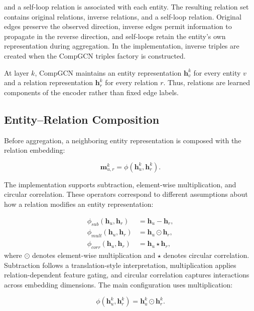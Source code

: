 and a self-loop relation is associated with each entity. The resulting
relation set contains original relations, inverse relations, and a self-loop
relation. Original edges preserve the observed direction, inverse edges permit
information to propagate in the reverse direction, and self-loops retain the
entity's own representation during aggregation. In the implementation,
inverse triples are created when the CompGCN triples factory is constructed.

At layer $k$, CompGCN maintains an entity representation
$\mathbf{h}_{v}^{k}$ for every entity $v$ and a relation representation
$\mathbf{h}_{r}^{k}$ for every relation $r$. Thus, relations are learned
components of the encoder rather than fixed edge labels.

\subsection{Entity--Relation Composition}

Before aggregation, a neighboring entity representation is composed with the
relation embedding:

\begin{equation}
    \mathbf{m}_{u,r}^{k}
    =
    \phi
    \left(
        \mathbf{h}_{u}^{k},
        \mathbf{h}_{r}^{k}
    \right).
\end{equation}

The implementation supports subtraction, element-wise multiplication, and
circular correlation. These operators correspond to different assumptions
about how a relation modifies an entity representation:

\begin{align}
    \phi_{sub}(\mathbf{h}_{u},\mathbf{h}_{r})
    &=
    \mathbf{h}_{u}-\mathbf{h}_{r}, \\
    \phi_{mult}(\mathbf{h}_{u},\mathbf{h}_{r})
    &=
    \mathbf{h}_{u}\odot\mathbf{h}_{r}, \\
    \phi_{corr}(\mathbf{h}_{u},\mathbf{h}_{r})
    &=
    \mathbf{h}_{u}\star\mathbf{h}_{r},
\end{align}
where $\odot$ denotes element-wise multiplication and $\star$ denotes circular
correlation. Subtraction follows a translation-style interpretation,
multiplication applies relation-dependent feature gating, and circular
correlation captures interactions across embedding dimensions. The main
configuration uses multiplication:

\begin{equation}
    \phi
    \left(
        \mathbf{h}_{u}^{k},
        \mathbf{h}_{r}^{k}
    \right)
    =
    \mathbf{h}_{u}^{k}\odot\mathbf{h}_{r}^{k}.
\end{equation}

